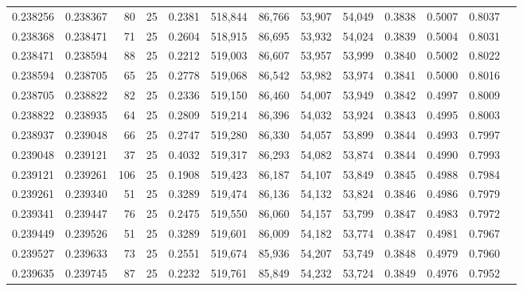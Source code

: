 \begin{tabular}{rrrrrrrrrrrrr}
0.238256 & 0.238367 &    80 &  25 &                                     0.2381 & 518,844 &  86,766 &  53,907 &  54,049 & 0.3838 & 0.5007 & 0.8037 \\
0.238368 & 0.238471 &    71 &  25 &                                     0.2604 & 518,915 &  86,695 &  53,932 &  54,024 & 0.3839 & 0.5004 & 0.8031 \\
0.238471 & 0.238594 &    88 &  25 &                                     0.2212 & 519,003 &  86,607 &  53,957 &  53,999 & 0.3840 & 0.5002 & 0.8022 \\
0.238594 & 0.238705 &    65 &  25 &                                     0.2778 & 519,068 &  86,542 &  53,982 &  53,974 & 0.3841 & 0.5000 & 0.8016 \\
0.238705 & 0.238822 &    82 &  25 &                                     0.2336 & 519,150 &  86,460 &  54,007 &  53,949 & 0.3842 & 0.4997 & 0.8009 \\
0.238822 & 0.238935 &    64 &  25 &                                     0.2809 & 519,214 &  86,396 &  54,032 &  53,924 & 0.3843 & 0.4995 & 0.8003 \\
0.238937 & 0.239048 &    66 &  25 &                                     0.2747 & 519,280 &  86,330 &  54,057 &  53,899 & 0.3844 & 0.4993 & 0.7997 \\
0.239048 & 0.239121 &    37 &  25 &                                     0.4032 & 519,317 &  86,293 &  54,082 &  53,874 & 0.3844 & 0.4990 & 0.7993 \\
0.239121 & 0.239261 &   106 &  25 &                                     0.1908 & 519,423 &  86,187 &  54,107 &  53,849 & 0.3845 & 0.4988 & 0.7984 \\
0.239261 & 0.239340 &    51 &  25 &                                     0.3289 & 519,474 &  86,136 &  54,132 &  53,824 & 0.3846 & 0.4986 & 0.7979 \\
0.239341 & 0.239447 &    76 &  25 &                                     0.2475 & 519,550 &  86,060 &  54,157 &  53,799 & 0.3847 & 0.4983 & 0.7972 \\
0.239449 & 0.239526 &    51 &  25 &                                     0.3289 & 519,601 &  86,009 &  54,182 &  53,774 & 0.3847 & 0.4981 & 0.7967 \\
0.239527 & 0.239633 &    73 &  25 &                                     0.2551 & 519,674 &  85,936 &  54,207 &  53,749 & 0.3848 & 0.4979 & 0.7960 \\
0.239635 & 0.239745 &    87 &  25 &                                     0.2232 & 519,761 &  85,849 &  54,232 &  53,724 & 0.3849 & 0.4976 & 0.7952 \\

\end{tabular}
